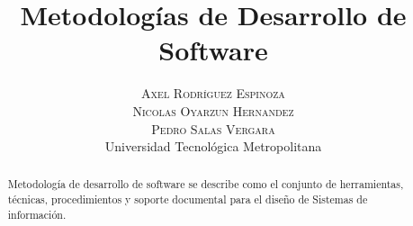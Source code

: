 \documentclass[twoside]{article}
\title{\vspace{-15mm}\fontsize{24pt}{10pt}\selectfont\textbf{Metodolog\'ias de Desarrollo de Software}} %
\author{
\large
\textsc{Axel Rodr\'iguez Espinoza}\\[2mm] %
\textsc{Nicolas Oyarzun Hernandez}\\[2mm] %
\textsc{Pedro Salas Vergara}\\[2mm] %
\normalsize Universidad Tecnol\'ogica Metropolitana \\ %
\vspace{-5mm}
}
\date{}
\begin{document}
\maketitle %

\thispagestyle{fancy} %


\begin{abstract}

Metodolog\'ia de desarrollo de software se describe como el conjunto de herramientas, t\'ecnicas, procedimientos y soporte documental para el dise\~no de Sistemas de informaci\'on.

\end{abstract}

\end{document}
